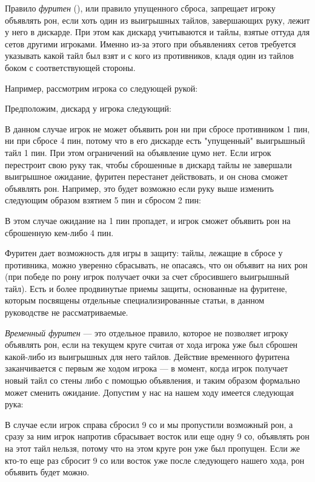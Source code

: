 Правило \textit{фуритен} (), или правило упущенного сброса, запрещает игроку объявлять рон, если хоть один из выигрышных тайлов, завершающих руку, лежит у него в дискарде. При этом как дискард учитываются и тайлы, взятые оттуда для сетов другими игроками. Именно из-за этого при объявлениях сетов требуется указывать какой тайл был взят и с кого из противников, кладя один из тайлов боком с соответствующей стороны.

Например, рассмотрим игрока со следующей рукой:


Предположим, дискард у игрока следующий:


В данном случае игрок не может объявить рон ни при сбросе противником 1 пин, ни при сбросе 4 пин, потому что в его дискарде есть "упущенный" выигрышный тайл 1 пин. При этом ограничений на объявление цумо нет. Если игрок перестроит свою руку так, чтобы сброшенные в дискард тайлы не завершали выигрышное ожидание, фуритен перестанет действовать, и он снова сможет объявлять рон. Например, это будет возможно если руку выше изменить следующим образом взятием 5 пин и сбросом 2 пин: 


В этом случае ожидание на 1 пин пропадет, и игрок сможет объявить рон на сброшенную кем-либо 4 пин. 

Фуритен дает возможность для игры в защиту: тайлы, лежащие в сбросе у противника, можно уверенно сбрасывать, не опасаясь, что он объявит на них рон (при победе по рону игрок получает очки за счет сбросившего выигрышный тайл). Есть и более продвинутые приемы защиты, основанные на фуритене, которым посвящены отдельные специализированные статьи, в данном руководстве не рассматриваемые.

\textit{Временный фуритен} --- это отдельное правило, которое не позволяет игроку объявлять рон, если на текущем круге считая от хода игрока уже был сброшен какой-либо из выигрышных для него тайлов. Действие временного фуритена заканчивается с первым же ходом игрока --- в момент, когда игрок получает новый тайл со стены либо с помощью объявления, и таким образом формально может сменить ожидание. Допустим у нас на нашем ходу имеется следующая рука:


В случае если игрок справа сбросил 9 со и мы пропустили возможный рон, а сразу за ним игрок напротив сбрасывает восток или еще одну 9 со, объявлять рон на этот тайл нельзя, потому что на этом круге рон уже был пропущен. Если же кто-то еще раз сбросит 9 со или восток уже после следующего нашего хода, рон объявить будет можно.

